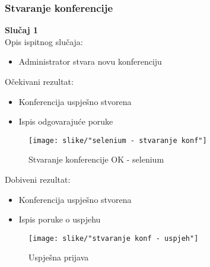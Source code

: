 			\eject 
			
			
			\subsubsection{Stvaranje konferencije}
			\textbf{Slučaj 1}\\
			Opis ispitnog slučaja:
			\begin{itemize}
				\item Administrator stvara novu konferenciju
			\end{itemize}
			Očekivani rezultat:
			\begin{itemize}
				\item Konferencija uspješno stvorena
			\end{itemize}
			\begin{itemize}
				\item Ispis odgovarajuće poruke
			\end{itemize}
			\begin{figure}[H]
				\texttt{[image: slike/"selenium - stvaranje konf"]}
				\centering
				\caption{Stvaranje konferencije OK - selenium}
				\label{uspjesna prijava - selenium}
			\end{figure}
			Dobiveni rezultat:
			\begin{itemize}
				\item Konferencija uspješno stvorena
			\end{itemize}
			\begin{itemize}
				\item Ispis poruke o uspjehu
			\end{itemize}
			\begin{figure}[H]
				\texttt{[image: slike/"stvaranje konf - uspjeh"]}
				\centering
				\caption{Uspješna prijava}
				\label{uspjesna prijava}
			\end{figure}
		
